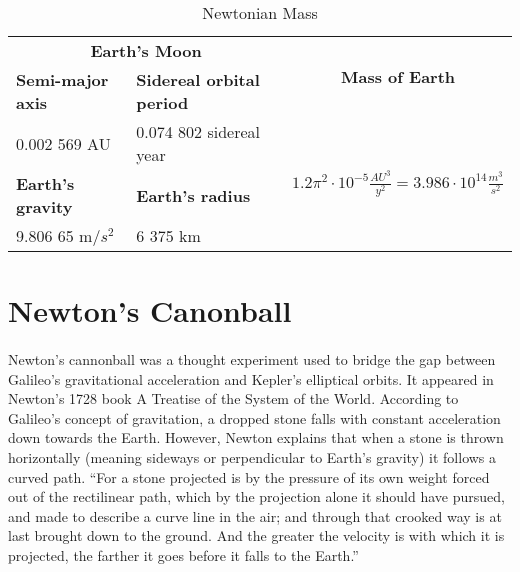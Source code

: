 \documentclass{book}
\begin{document}
    \begin{table}[h]
        \centering   
        \begin{tabular}{|l|l|c|}
            \hline
            \multicolumn{2}{|c|}{\textbf{Earth's Moon\index{Earth}}} & \multirow{2}{*}{\textbf{Mass of Earth}} \\
            \cline{1-2}
            \textbf{Semi-major axis} & \textbf{Sidereal orbital period} &  \\
            \hline
            0.002 569 AU & 0.074 802 sidereal year & 
                \multirow{3}{*}{$1.2 \pi^2 \cdot 10^{-5}  \frac{AU^3}{y^2} = 3.986 \cdot 10^{14} \frac{m^3}{s^2}$} \\
            \cline{1-2}
            \textbf{Earth's gravity} & \textbf{Earth's radius} &  \\
            \cline{1-2} 
            9.806 65 m/$s^2$ & 6 375 km &  \\
            \hline
        \end{tabular}
        \caption{Newtonian Mass}
    \end{table}
    	
    
    \section{Newton's Canonball}
    \label{sec:Canonball}
    \paragraph{}
    Newton's cannonball was a thought experiment used to bridge the gap between Galileo's gravitational acceleration and Kepler's elliptical orbits. It appeared in Newton's 1728 book A Treatise of the System of the World. According to Galileo's concept of gravitation, a dropped stone falls with constant acceleration down towards the Earth. However, Newton explains that when a stone is thrown horizontally (meaning sideways or perpendicular to Earth's gravity) it follows a curved path. ``For a stone projected is by the pressure of its own weight forced out of the rectilinear path, which by the projection alone it should have pursued, and made to describe a curve line in the air; and through that crooked way is at last brought down to the ground. And the greater the velocity is with which it is projected, the farther it goes before it falls to the Earth.''
    
\end{document}
